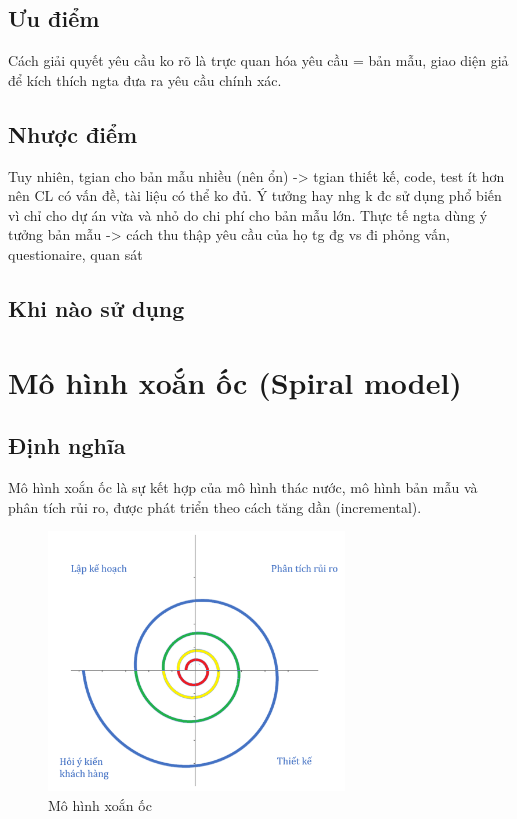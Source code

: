 \documentclass[14pt]{extarticle}
\begin{document}
\subsection{Ưu điểm}
Cách giải quyết yêu cầu ko rõ là trực quan hóa yêu cầu = bản mẫu, giao diện giả để kích thích ngta đưa ra yêu cầu chính xác. 
\subsection{Nhược điểm}
Tuy nhiên, tgian cho bản mẫu nhiều (nên ổn) -> tgian thiết kế, code, test ít hơn nên CL có vấn đề, tài liệu có thể ko đủ.
Ý tưởng hay nhg k đc sử dụng phổ biến vì chỉ cho dự án vừa và nhỏ do chi phí cho bản mẫu lớn.
Thực tế ngta dùng ý tưởng bản mẫu -> cách thu thập yêu cầu của họ tg đg vs đi phỏng vấn, questionaire, quan sát

\subsection{Khi nào sử dụng}

\newpage
\section{Mô hình xoắn ốc (Spiral model)}
\subsection{Định nghĩa}

Mô hình xoắn ốc là sự kết hợp của mô hình thác nước, mô hình bản mẫu
và phân tích rủi ro, được phát triển theo cách tăng dần (incremental).\\

\begin{figure}[h]
  \centering
  \includegraphics[width=0.7\textwidth]{spiral.png}
  \caption{Mô hình xoắn ốc}
  \label{fig:spiral-model}
\end{figure}
\end{document}
